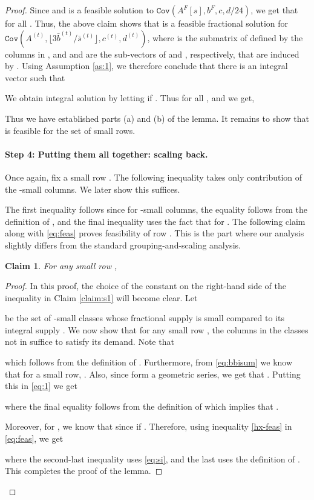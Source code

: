 \documentclass[11pt]{article}
\newlength{\parcor}
\newtheorem{claim}{Claim}
\newcommand{\cov}[1]{\ensuremath{\mathtt{Cov}(#1)}}
\newcommand{\bb}{\ensuremath{\bar{b}}}
\newcommand{\bs}{\ensuremath{\bar{s}}}
\newcommand{\1}{\mathbb{1}}
\def\ni{\noindent}
\begin{document}
\begin{proof}
{Since  and  is a feasible solution to 
\cov{A^F[s],b^F,c,d/24}, we get that  for all . Thus, the above
claim shows that  is a feasible fractional solution for
\cov{A^{(t)},\lfloor 3\bb^{(t)}/\bs^{(t)}\rfloor,c^{(t)},d^{(t)}}, where 
 is the submatrix of  defined by the columns in , and 
 and  are the sub-vectors of  and , respectively, that are induced by
. Using Assumption \ref{as:1}, we therefore conclude that there is an integral vector 
such that 


We obtain integral solution  by letting  if .
Thus  for all , and we get, 


\ni
Thus we have established parts (a) and (b) of the lemma.
It remains to show that  is feasible for the set of small rows. \\

\vspace*{\parcor}
\paragraph{Step 4: Putting them all together: scaling back.}

Once again, fix a small row . The following inequality takes only contribution of the -small columns.
We later show this suffices.

The first inequality follows since  for
-small columns, the equality follows from the definition
of , and the final inequality uses the fact that  for . The following claim along with
\eqref{eq:feas} proves feasibility of row .  This is the part where
our analysis slightly differs from the standard grouping-and-scaling
analysis.

\begin{claim}
For any small row , 

\end{claim}
\begin{proof}
In this proof, the choice of the constant  on the right-hand side
of the inequality in Claim \ref {claim:s1} will become clear. Let 

be the set of -small classes  whose fractional supply
 is small compared to its integral supply . 
We now show that for any small row , the columns in the classes not in  
suffice to satisfy its demand. 
Note that

which follows from the definition of . Furthermore, from \eqref{eq:bbisum} we know that for a small row,
. Also, since  form a geometric series, we get that 
. Putting this in \eqref{eq:1} we get

where the final equality follows from the definition of  which implies that . 

Moreover, for , we know that  since
 if .  Therefore, using inequality
\eqref{hx-feas} in \eqref{eq:feas}, we get

where the second-last inequality uses \eqref{eq:si}, and the last uses the definition of . This completes the proof of the lemma.
\end{proof} }
\end{proof}
\end{document}
